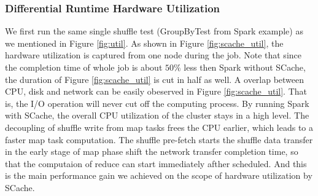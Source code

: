 \subsubsection{Differential Runtime Hardware Utilization} 
We first run the same single shuffle test (GroupByTest from Spark example\cite{sparksource}) as we mentioned in Figure \ref{fig:util}. As shown in Figure \ref{fig:scache_util}, the hardware utilization is captured from one node during the job. Note that since the completion time of whole job is about $50\%$ less then Spark without SCache, the duration of Figure \ref{fig:scache_util} is cut in half as well. A overlap between CPU, disk and network can be easily obeserved in Figure \ref{fig:scache_util}. That is, the I/O operation will never cut off the computing process. By running Spark with SCache, the overall CPU utilization of the cluster stays in a high level. The decoupling of shuffle write from map tasks frees the CPU earlier, which leads to a faster map task computation. The shuffle pre-fetch starts the shuffle data transfer in the early stage of map phase shift the network transfer completion time, so that the computaion of reduce can start immediately afther scheduled. And this is the main performance gain we achieved on the scope of hardware utilization by SCache.
